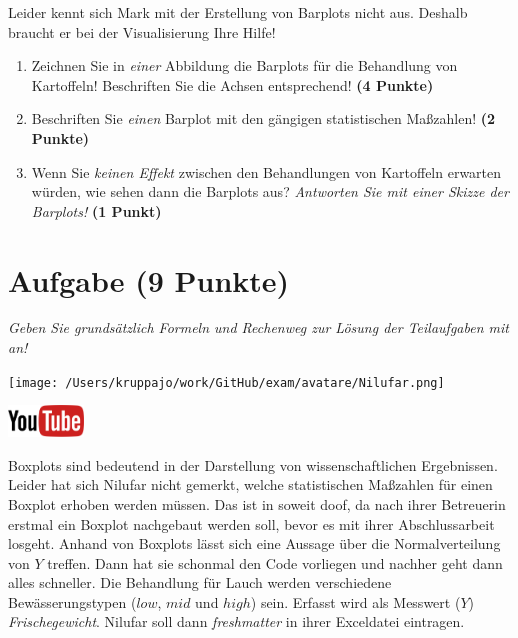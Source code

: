 \documentclass[a4paper, 9pt]{scrartcl}\usepackage[]{graphicx}\usepackage[]{xcolor}
\begin{document}
Leider kennt sich Mark mit der Erstellung von Barplots nicht aus. Deshalb braucht er bei der Visualisierung Ihre Hilfe!

\begin{enumerate}
\item Zeichnen Sie in \textit{einer} Abbildung die Barplots für die
  Behandlung von Kartoffeln! Beschriften Sie die Achsen entsprechend!
  \textbf{(4 Punkte)}
\item Beschriften Sie \textit{einen} Barplot mit den gängigen
  statistischen Maßzahlen! \textbf{(2 Punkte)}
\item Wenn Sie \textit{keinen Effekt} zwischen den Behandlungen von
  Kartoffeln erwarten würden, wie sehen dann die Barplots aus?
  \textit{Antworten Sie mit einer Skizze der Barplots!}
  \textbf{(1 Punkt)}
\end{enumerate} 
\clearpage

\section{Aufgabe \hfill (9 Punkte)}

\textit{Geben Sie grundsätzlich Formeln und Rechenweg zur Lösung der Teilaufgaben mit an!} \\[1Ex]
 

 
\begin{minipage}[t]{0.5\textwidth}
\texttt{[image: /Users/kruppajo/work/GitHub/exam/avatare/Nilufar.png]}
\end{minipage}
\begin{minipage}[t]{0.5\textwidth}
\hfill
\href{https://youtu.be/Xf0yE-o7bEU}{\includegraphics[width = 2cm]{img/youtube}}\\[1Ex]
\end{minipage}
\vspace{1ex}



Boxplots sind bedeutend in der Darstellung von wissenschaftlichen Ergebnissen. Leider hat sich Nilufar nicht gemerkt, welche statistischen Maßzahlen für einen Boxplot erhoben werden müssen. Das ist in soweit doof, da nach ihrer Betreuerin erstmal ein Boxplot nachgebaut werden soll, bevor es mit ihrer Abschlussarbeit losgeht. Anhand von Boxplots lässt sich eine Aussage über die Normalverteilung von $Y$ treffen. Dann hat sie schonmal den \Rlogo Code vorliegen und nachher geht dann alles schneller. Die Behandlung für Lauch werden verschiedene Bewässerungstypen ($low$, $mid$ und $high$) sein. Erfasst wird als Messwert ($Y$) \textit{Frischegewicht}. Nilufar soll dann \textit{freshmatter} in ihrer Exceldatei eintragen.
\end{document}

